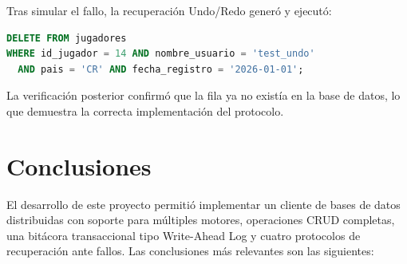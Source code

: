 \documentclass[12pt,letterpaper]{article}
\begin{document}
Tras simular el fallo, la recuperación Undo/Redo generó y ejecutó:
\begin{lstlisting}[language=SQL, caption={SQL de UNDO generado automáticamente por el protocolo P4}]
DELETE FROM jugadores
WHERE id_jugador = 14 AND nombre_usuario = 'test_undo'
  AND pais = 'CR' AND fecha_registro = '2026-01-01';
\end{lstlisting}

La verificación posterior confirmó que la fila ya no existía en la base de datos, lo que
demuestra la correcta implementación del protocolo.

\section{Conclusiones}

El desarrollo de este proyecto permitió implementar un cliente de bases de datos distribuidas
con soporte para múltiples motores, operaciones CRUD completas, una bitácora transaccional
tipo Write-Ahead Log y cuatro protocolos de recuperación ante fallos. Las conclusiones
más relevantes son las siguientes:
\end{document}
